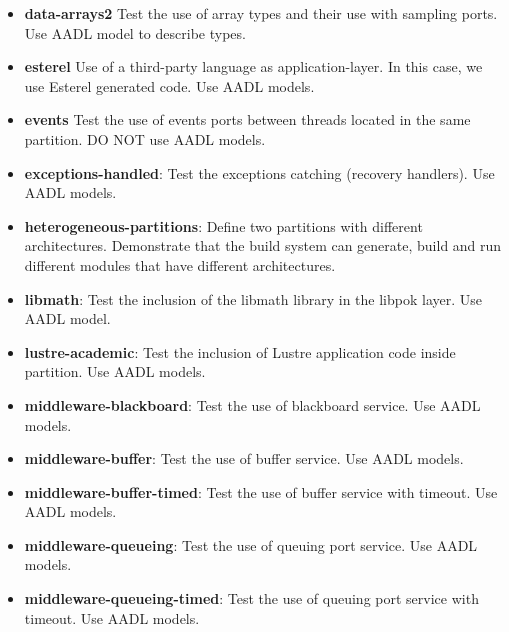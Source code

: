 \begin{itemize}
   \item
      \textbf{data-arrays2}
         Test the use of array types and their use
         with sampling ports. Use AADL model to describe types.

   \item
      \textbf{esterel}
         Use of a third-party language as application-layer.
         In this case, we use Esterel generated code. Use
         AADL models.

   \item
      \textbf{events}
         Test the use of events ports between threads located
         in the same partition. DO NOT use AADL models.

   \item
      \textbf{exceptions-handled}:
         Test the exceptions catching (recovery
         handlers). Use AADL models.

   \item
      \textbf{heterogeneous-partitions}:
         Define two partitions with
         different architectures. Demonstrate that the build
         system can generate, build and run different modules
         that have different architectures.


   \item
      \textbf{libmath}:
         Test the inclusion of the libmath library in the libpok layer.
         Use AADL model.

   \item
      \textbf{lustre-academic}:
         Test the inclusion of Lustre application code
         inside partition. Use AADL models.

   \item
      \textbf{middleware-blackboard}:
         Test the use of blackboard service. Use AADL models.

   \item
      \textbf{middleware-buffer}:
         Test the use of buffer service. Use AADL models.

   \item
      \textbf{middleware-buffer-timed}:
         Test the use of buffer service with timeout.
         Use AADL models.

   \item
      \textbf{middleware-queueing}:
         Test the use of queuing port service. Use AADL models.

   \item
      \textbf{middleware-queueing-timed}:
         Test the use of queuing port service with timeout.
         Use AADL models.


\end{itemize}
